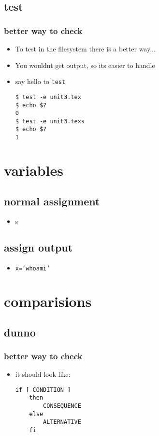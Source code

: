 \documentclass[handout]{beamer}
\newcommand{\code}[1]{\colorbox{lGray}{\texttt{#1}}}
\begin{document}
    \subsection{test}
		\begin{frame}[fragile]
            \frametitle{better way to check}
			\begin{itemize}
                \item<1-> To test in the filesystem there is a better way...
                \item<2-> You wouldnt get output, so its easier to handle
                \item<3-> say hello to \code{test}
                    \begin{verbatim}
$ test -e unit3.tex 
$ echo $?
0
$ test -e unit3.texs 
$ echo $?
1
\end{verbatim}
            \end{itemize}
		\end{frame}
\section{variables}
    \subsection{normal assignment}
        \begin{frame}
            \begin{itemize}
                \item<1-> s
            \end{itemize}
        \end{frame}
    \subsection{assign output}
        \begin{frame}
            \begin{itemize}
                \item<1-> \code{x=`whoami`}
            \end{itemize}
        \end{frame}
\section{comparisions}
    \subsection{dunno}
		\begin{frame}[fragile]
            \frametitle{better way to check}
			\begin{itemize}
                \item<1-> it should look like:
                    \begin{verbatim}
if [ CONDITION ]
    then
        CONSEQUENCE
    else
        ALTERNATIVE
    fi
\end{verbatim}
            \end{itemize}
		\end{frame}
\end{document}
